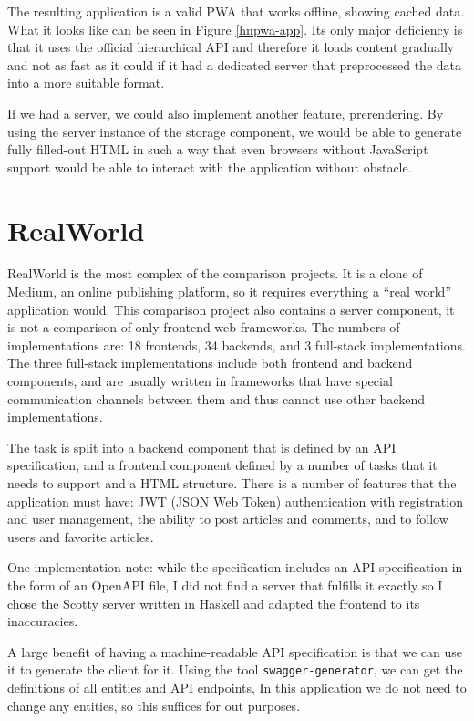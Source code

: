 \documentclass[english,zadani,odsaz]{fitthesis}
\begin{document}
The resulting application is a valid PWA that works offline, showing cached
data. What it looks like can be seen in Figure \ref{hnpwa-app}. Its only major
deficiency is that it uses the official hierarchical API and therefore it loads
content gradually and not as fast as it could if it had a dedicated server that
preprocessed the data into a more suitable format.

If we had a server, we could also implement another feature, prerendering. By
using the server instance of the storage component, we would be able to generate
fully filled-out HTML in such a way that even browsers without JavaScript
support would be able to interact with the application without obstacle.

\section{RealWorld}
\label{sec:org9d38324}
RealWorld \cite{realworld} is the most complex of the comparison projects. It is a
clone of Medium, an online publishing platform, so it requires everything a
``real world'' application would. This comparison project also contains a server
component, it is not a comparison of only frontend web frameworks. The numbers
of implementations are: 18 frontends, 34 backends, and 3 full-stack
implementations. The three full-stack implementations include both frontend and
backend components, and are usually written in frameworks that have special
communication channels between them and thus cannot use other backend
implementations.

The task is split into a backend component that is defined by an API
specification, and a frontend component defined by a number of tasks that it
needs to support and a HTML structure. There is a number of features that the
application must have: JWT (JSON Web Token) authentication with registration and
user management, the ability to post articles and comments, and to follow users
and favorite articles.

One implementation note: while the specification includes an API specification
in the form of an OpenAPI file, I did not find a server that fulfills it exactly
so I chose the Scotty server written in Haskell and adapted the frontend to its
inaccuracies.

A large benefit of having a machine-readable API specification is that we can
use it to generate the client for it. Using the tool \texttt{swagger-generator}, we can
get the definitions of all entities and API endpoints, In this application we do
not need to change any entities, so this suffices for out purposes.
\end{document}
